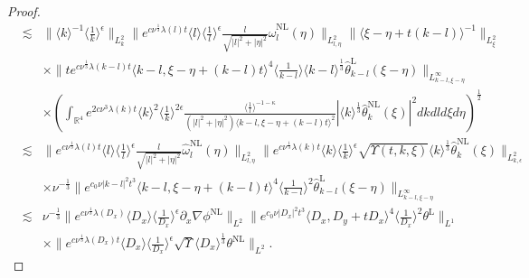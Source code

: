 \documentclass[reqno, 12pt]{amsart} %
\theoremstyle{plain} %
\theoremstyle{definition}
\theoremstyle{remark}
\numberwithin{equation}{section} %
\begin{document}
\begin{proof}
\begin{eqnarray*}
			& \lesssim&\|\langle k\rangle^{-1}\langle\frac{1}{k}\rangle^\epsilon\|_{L_k^2}\|e^{c \nu^{\frac{1}{3}} \lambda(l) t}\langle l\rangle\langle\frac{1}{l}\rangle^\epsilon \frac{l}{\sqrt{|l|^2+|\eta|^2}} \hat{\omega}_l^{\mathrm{NL}}(\eta)\|_{L_{l, \eta}^2}\|\langle\xi-\eta+t(k-l)\rangle^{-1}\|_{L_{\xi}^2} \\
			&& \times\|t e^{c \nu^{\frac{1}{3}} \lambda(k-l) t}\langle k-l, \xi-\eta+(k-l) t\rangle^4\langle\frac{1}{k-l}\rangle \langle k-l \rangle^\frac13 \hat{\theta}_{k-l}^{\mathrm{L}}(\xi-\eta)\|_{L_{k-l, \xi-\eta}^{\infty}} \\
			&& \times\left(\int_{\mathbb{R}^4} e^{2 c \nu^3 \lambda(k) t}\langle k\rangle^2\langle\frac{1}{k}\rangle^{2 \epsilon} \frac{\langle\frac{1}{l}\rangle^{-1-\kappa}}{\left(|l|^2+|\eta|^2\right)\langle k-l, \xi-\eta+(k-l) t\rangle^2}\left| \langle k \rangle^\frac13 \hat{\theta}_k^{\mathrm{NL}}(\xi)\right|^2 d k d l d \xi d \eta\right)^{\frac{1}{2}} \\
			& \lesssim&\|e^{c \nu^{\frac{1}{3}} \lambda(l) t}\langle l\rangle\langle\frac{1}{l}\rangle^\epsilon \frac{l}{\sqrt{|l|^2+|\eta|^2}}   \hat{\omega}_l^{\mathrm{NL}}(\eta)\|_{L_{l, \eta}^2}  \|e^{c \nu^{\frac{1}{3}} \lambda(k) t}\langle k\rangle\langle\frac{1}{k}\rangle^\epsilon \sqrt{\Upsilon(t, k, \xi)} \langle k \rangle^\frac13  \hat{\theta}_k^{\mathrm{NL}}(\xi)\|_{L_{k, \epsilon}^2} \\
			&& \times \nu^{-\frac{1}{3}}\|e^{c_0 \nu|k-l|^2 t^3}\langle k-l, \xi-\eta+(k-l) t\rangle^4\langle\frac{1}{k-l}\rangle^2  \hat{\theta}_{k-l}^{\mathrm{L}}(\xi-\eta)\|_{L_{k-l, \xi-\eta}^{\infty}} \\
			& \lesssim& \nu^{-\frac{1}{3}}\|e^{c \nu^{\frac{1}{3}} \lambda\left(D_x\right)}\langle D_x\rangle\langle\frac{1}{D_x}\rangle^\epsilon \partial_x \nabla \phi^{\mathrm{NL}}\|_{L^2}\|e^{c_0 \nu\left|D_x\right|^2 t^3}\langle D_x, D_y+t D_x\rangle^4\langle\frac{1}{D_x}\rangle^2 \theta^{\mathrm{L}}\|_{L^1} \\
			&& \times\|e^{c \nu^{\frac{1}{3}} \lambda\left(D_x\right) t}\langle D_x\rangle\langle\frac{1}{D_x}\rangle^\epsilon \sqrt{\Upsilon} \langle D_x \rangle^\frac13  \theta^{\mathrm{NL}}\|_{L^2} .
		\end{eqnarray*} 

\end{proof}
\end{document}
